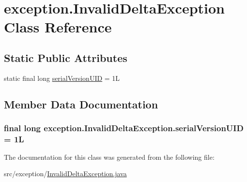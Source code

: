 \hypertarget{classexception_1_1_invalid_delta_exception}{
\section{exception.InvalidDeltaException Class Reference}
\label{classexception_1_1_invalid_delta_exception}
}
\subsection*{Static Public Attributes}
\begin{DoxyCompactItemize}
\item 
static final long \hyperlink{classexception_1_1_invalid_delta_exception_ae3f0d4fd5255d472a903dfa2f70c1e5b}{serialVersionUID} = 1L
\end{DoxyCompactItemize}


\subsection{Member Data Documentation}
\hypertarget{classexception_1_1_invalid_delta_exception_ae3f0d4fd5255d472a903dfa2f70c1e5b}{
\subsubsection[{serialVersionUID}]{\setlength{\rightskip}{0pt plus 5cm}final long {\bf exception.InvalidDeltaException.serialVersionUID} = 1L}}
\label{classexception_1_1_invalid_delta_exception_ae3f0d4fd5255d472a903dfa2f70c1e5b}


The documentation for this class was generated from the following file:\begin{DoxyCompactItemize}
\item 
src/exception/\hyperlink{exception_2_invalid_delta_exception_8java}{InvalidDeltaException.java}\end{DoxyCompactItemize}
